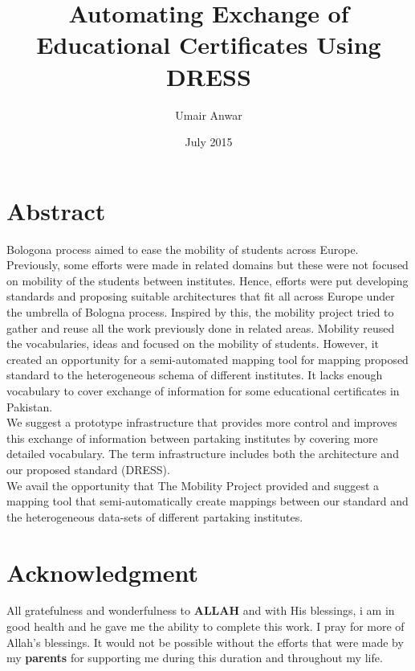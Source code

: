 \documentclass[12pt,a4paper,oneside]{book}
\title{Automating Exchange of Educational Certificates Using DRESS}
\author{Umair Anwar}
\date{July 2015}
\begin{document}
\maketitle


\chapter*{Abstract}

 Bologona process aimed to ease the mobility of students across Europe. Previously, some efforts were made in related domains but these were not focused on mobility of the students between institutes. Hence, efforts were put developing standards and proposing suitable architectures that fit all across Europe under the umbrella of Bologna process. Inspired by this, the mobility project tried to gather and reuse all the work previously done in related areas. Mobility reused the vocabularies, ideas and focused on the mobility of students. However, it created an opportunity for a semi-automated mapping tool for mapping proposed standard to the heterogeneous schema of different institutes. It lacks enough vocabulary to cover exchange of information for some educational certificates in Pakistan. \\
 
 We suggest a prototype infrastructure that provides more control and improves this exchange of information between partaking institutes by covering more detailed vocabulary. The term infrastructure includes both the architecture and our proposed standard (DRESS). \\
 
 We avail the opportunity that The Mobility Project provided and suggest a mapping tool that semi-automatically create mappings between our standard and the heterogeneous data-sets of different partaking institutes. 

\certificateoforiginality
\chapter*{Acknowledgment}
All gratefulness and wonderfulness to {\bfseries ALLAH} and with His blessings, i am in good health and he gave me the ability to complete this work. I pray for more of Allah's blessings. It would not be possible without the efforts that were made by my {\bfseries parents} for supporting me during this duration and throughout my life. \\
\end{document}
